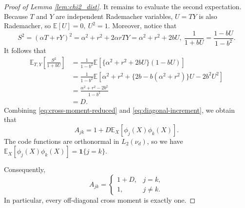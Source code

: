\documentclass[10pt,a4paper]{amsart}
\begin{document}
\begin{proof}[Proof of Lemma \ref{lem:chi2_dist}]
It remains to evaluate the second expectation.  Because \(T\) and \(Y\)
are independent Rademacher variables, \(U=TY\) is also Rademacher, so $\mathbb E[U]=0,
\ U^2=1$.
Moreover, notice that
\[
S^2
=
(\alpha T+rY)^2
=
\alpha^2+r^2+2\alpha rTY
=
\alpha^2+r^2+2bU,\ \frac1{1+bU}
=
\frac{1-bU}{1-b^2}.
\]
It follows that
\begin{align}
\mathbb E_{T,Y}
\left[
\frac{S^2}{1+bU}
\right]
&=
\frac1{1-b^2}
\mathbb E
\left[
\{\alpha^2+r^2+2bU\}(1-bU)
\right]
\nonumber\\
&=
\frac1{1-b^2}
\mathbb E
\left[
\alpha^2+r^2
+\{2b-b(\alpha^2+r^2)\}U
-2b^2U^2
\right]
\nonumber\\
&=
\frac{\alpha^2+r^2-2b^2}{1-b^2}
\nonumber\\
&=
D.
\label{eq:diagonal-increment}
\end{align}
Combining \eqref{eq:cross-moment-reduced} and
\eqref{eq:diagonal-increment}, we obtain that
\[
A_{jk}
=
1+D\mathbb E_X[\phi_j(X)\phi_k(X)].
\]
The code functions are orthonormal in \(L_2(\nu_d)\), so we have $\mathbb E_X[\phi_j(X)\phi_k(X)]
=
\mathbf 1\{j=k\}$.

Consequently,
\begin{equation}
A_{jk}
=
\begin{cases}
1+D, & j=k,\\
1,   & j\neq k.
\end{cases}
\label{eq:cross-moment-final}
\end{equation}
In particular, every off-diagonal cross moment is exactly one.


\end{proof}
\end{document}
